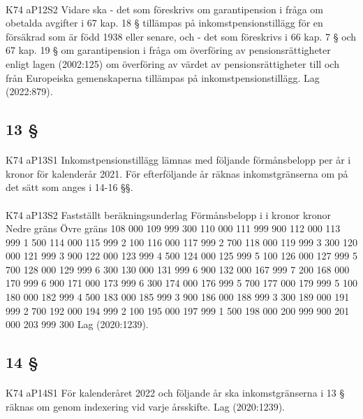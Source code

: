 \documentclass[a4paper,notitlepage,openany,10pt]{book}
\begin{document}
\paragraph*{}
{\tiny K74 aP12S2}
Vidare ska
\newline - det som föreskrivs om garantipension i fråga om obetalda avgifter i 67 kap. 18 § tillämpas på inkomstpensionstillägg för en försäkrad som är född 1938 eller senare, och
\newline - det som föreskrivs i 66 kap. 7 § och 67 kap. 19 § om garantipension i fråga om överföring av pensionsrättigheter enligt lagen (2002:125) om överföring av värdet av pensionsrättigheter till och från Europeiska gemenskaperna tillämpas på inkomstpensionstillägg.
Lag (2022:879).
\subsection*{13 §}
\paragraph*{}
{\tiny K74 aP13S1}
Inkomstpensionstillägg lämnas med följande förmånsbelopp per år i kronor för kalenderår 2021. För efterföljande år räknas inkomstgränserna om på det sätt som anges i 14-16 §§.
\paragraph*{}
{\tiny K74 aP13S2}
Fastställt beräkningsunderlag Förmånsbelopp i
i kronor kronor
Nedre gräns Övre gräns
108 000 109 999 300
110 000 111 999 900
112 000 113 999 1 500
114 000 115 999 2 100
116 000 117 999 2 700
118 000 119 999 3 300
120 000 121 999 3 900
122 000 123 999 4 500
124 000 125 999 5 100
126 000 127 999 5 700
128 000 129 999 6 300
130 000 131 999 6 900
132 000 167 999 7 200
168 000 170 999 6 900
171 000 173 999 6 300
174 000 176 999 5 700
177 000 179 999 5 100
180 000 182 999 4 500
183 000 185 999 3 900
186 000 188 999 3 300
189 000 191 999 2 700
192 000 194 999 2 100
195 000 197 999 1 500
198 000 200 999 900
201 000 203 999 300
Lag (2020:1239).
\subsection*{14 §}
\paragraph*{}
{\tiny K74 aP14S1}
För kalenderåret 2022 och följande år ska inkomstgränserna i 13 § räknas om genom indexering vid varje årsskifte.
Lag (2020:1239).
\end{document}
